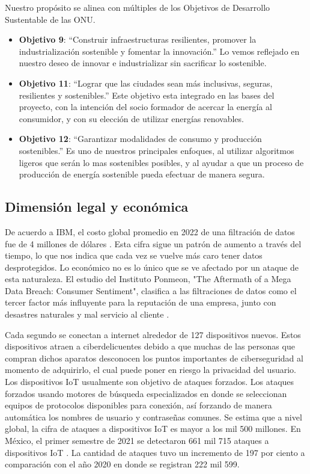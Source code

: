\documentclass{article}
\begin{document}
            Nuestro propósito se alinea con múltiples de los Objetivos de Desarrollo Sustentable de las ONU.
            \begin{itemize}
                \item \textbf{Objetivo 9}: \enquote{Construir infraestructuras resilientes, promover la industrialización sostenible y fomentar la innovación.}  \cite{obj9} Lo vemos reflejado en nuestro deseo de innovar e industrializar sin sacrificar lo sostenible.
                \item \textbf{Objetivo 11}: \enquote{Lograr que las ciudades sean más inclusivas, seguras, resilientes y sostenibles.} \cite{obj11} Este objetivo esta integrado en las bases del proyecto, con la intención del socio formador de acercar la energía al consumidor, y con su elección de utilizar energías renovables.
                \item \textbf{Objetivo 12}: \enquote{Garantizar modalidades de consumo y producción sostenibles.}\cite{obj12} Es uno de nuestros principales enfoques, al utilizar algoritmos ligeros que serán lo mas sostenibles posibles, y al ayudar a que un proceso de producción de energía sostenible pueda efectuar de manera segura.
            \end{itemize}

        \subsection{Dimensión legal y económica}

            De acuerdo a IBM, el costo global promedio en 2022 de una filtración de datos fue de 4 millones de dólares \cite{cost_DB}. Esta cifra sigue un patrón de aumento a través del tiempo, lo que nos indica que cada vez se vuelve más caro tener datos desprotegidos. Lo económico no es lo único que se ve afectado por un ataque de esta naturaleza. El estudio del Instituto Ponmeon, "The Aftermath of a Mega Data Breach: Consumer Sentiment", clasifica a las filtraciones de datos como el tercer factor más influyente para la reputación de una empresa, junto con desastres naturales y mal servicio al cliente \cite{ponmeon}.

            Cada segundo se conectan a internet alrededor de 127 dispositivos nuevos. Estos dispositivos atraen a ciberdelicuentes debido a que muchas de las personas que compran dichos aparatos desconocen los puntos importantes de ciberseguridad al momento de adquirirlo, el cual puede poner en riesgo la privacidad del usuario. Los dispositivos IoT usualmente son objetivo de ataques forzados. Los ataques forzados usando motores de búsqueda especializados en donde se seleccionan equipos de protocolos disponibles para conexión, así forzando de manera automática los nombres de usuario y contraseñas comunes. Se estima que a nivel global, la cifra de ataques a dispositivos IoT es mayor a los mil 500 millones. En México, el primer semestre de 2021 se detectaron 661 mil 715 ataques a dispositivos IoT \cite{rios_2022}. La cantidad de ataques tuvo un incremento de 197 por ciento a comparación con el año 2020 en donde se registran 222 mil 599.
\end{document}
